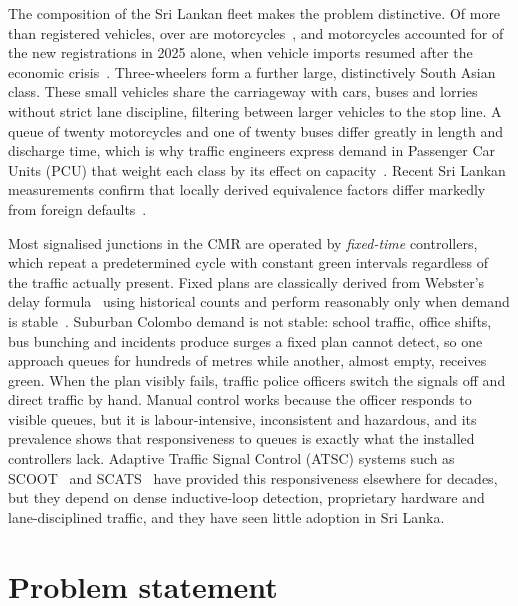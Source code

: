 The composition of the Sri Lankan fleet makes the problem distinctive. Of more than  registered vehicles, over  are motorcycles~\cite{newsfirst2026motorcycles}, and motorcycles accounted for  of the  new registrations in 2025 alone, when vehicle imports resumed after the economic crisis~\cite{dailymirror2026registrations,dmt_stats}. Three-wheelers form a further large, distinctively South Asian class. These small vehicles share the carriageway with cars, buses and lorries without strict lane discipline, filtering between larger vehicles to the stop line. A queue of twenty motorcycles and one of twenty buses differ greatly in length and discharge time, which is why traffic engineers express demand in Passenger Car Units (PCU) that weight each class by its effect on capacity~\cite{irc106,hcm2016}. Recent Sri Lankan measurements confirm that locally derived equivalence factors differ markedly from foreign defaults~\cite{perera2025pce}.

Most signalised junctions in the CMR are operated by \emph{fixed-time} controllers, which repeat a predetermined cycle with constant green intervals regardless of the traffic actually present. Fixed plans are classically derived from Webster's delay formula~\cite{webster1958} using historical counts and perform reasonably only when demand is stable~\cite{papageorgiou2003review}. Suburban Colombo demand is not stable: school traffic, office shifts, bus bunching and incidents produce surges a fixed plan cannot detect, so one approach queues for hundreds of metres while another, almost empty, receives green. When the plan visibly fails, traffic police officers switch the signals off and direct traffic by hand. Manual control works because the officer responds to visible queues, but it is labour-intensive, inconsistent and hazardous, and its prevalence shows that responsiveness to queues is exactly what the installed controllers lack. Adaptive Traffic Signal Control (ATSC) systems such as SCOOT~\cite{hunt1981scoot} and SCATS~\cite{sims1980scats} have provided this responsiveness elsewhere for decades, but they depend on dense inductive-loop detection, proprietary hardware and lane-disciplined traffic, and they have seen little adoption in Sri Lanka.

\section{Problem statement}\label{sec:intro-problem}

